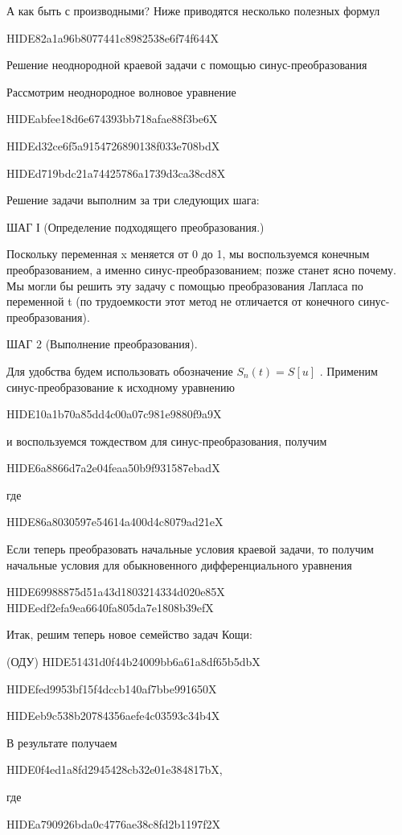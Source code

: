 \documentclass[
  ukrainian,
]{article}
\begin{document}
А как быть с производными? Ниже приводятся несколько полезных формул

HIDE82a1a96b8077441c8982538e6f74f644X

Решение неоднородной краевой задачи с помощью синус-преобразования

Рассмотрим неоднородное волновое уравнение

HIDEabfee18d6e674393bb718afae88f3be6X

HIDEd32ce6f5a9154726890138f033e708bdX

HIDEd719bdc21a74425786a1739d3ca38cd8X

Решение задачи выполним за три следующих шага:

ШАГ І (Определение подходящего преобразования.)

Поскольку переменная x меняется от 0 до 1, мы воспользуемся конечным
преобразованием, а именно синус-преобразованием; позже станет ясно
почему. Мы могли бы решить эту задачу с помощью преобразования Лапласа
по переменной t (по трудоемкости этот метод не отличается от конечного
синус-преобразования).

ШАГ 2 (Выполнение преобразования).

Для удобства будем использовать обозначение \(S_n(t) = S[u]\) . Применим
синус-преобразование к исходному уравнению

HIDE10a1b70a85dd4c00a07c981e9880f9a9X

и воспользуемся тождеством для синус-преобразования, получим

HIDE6a8866d7a2e04feaa50b9f931587ebadX

где

HIDE86a8030597e54614a400d4c8079ad21eX

Если теперь преобразовать начальные условия краевой задачи, то получим
начальные условия для обыкновенного дифференциального уравнения

HIDE69988875d51a43d1803214334d020e85X
HIDEedf2efa9ea6640fa805da7e1808b39efX

Итак, решим теперь новое семейство задач Кощи:

(ОДУ) HIDE51431d0f44b24009bb6a61a8df65b5dbX

HIDEfed9953bf15f4dccb140af7bbe991650X

HIDEeb9c538b20784356aefe4c03593c34b4X

В результате получаем

HIDE0f4ed1a8fd2945428cb32e01e384817bX,

где

HIDEa790926bda0c4776ae38c8fd2b1197f2X
\end{document}

